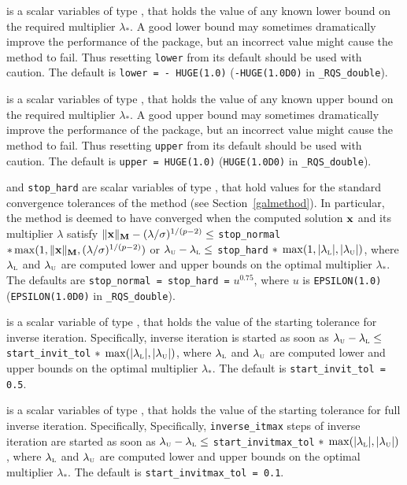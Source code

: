 \documentclass{galahad}
\newcommand{\packagename}{RQS}
\newcommand{\fullpackagename}{\libraryname\_\packagename}
\begin{document}
\begin{description}
 is a scalar variables of type \realdp, that holds the value
of any known lower bound on the required multiplier $\lambda_*$. A good lower
bound may sometimes dramatically improve the performance of the package, but
an incorrect value might cause the method to fail. Thus resetting
{\tt lower} from its default should be used with caution.
The default is {\tt lower = - HUGE(1.0)}
({\tt -HUGE(1.0D0)} in {\tt \fullpackagename\_double}).

 is a scalar variables of type \realdp, that holds the value
of any known upper bound on the required multiplier $\lambda_*$. A good upper
bound may sometimes dramatically improve the performance of the package, but
an incorrect value might cause the method to fail. Thus resetting
{\tt upper} from its default should be used with caution.
The default is {\tt upper = HUGE(1.0)}
({\tt HUGE(1.0D0)} in {\tt \fullpackagename\_double}).

 and {\tt stop\_hard} are scalar variables of type \realdp,
that hold values for the standard convergence tolerances of the method
(see Section~\ref{galmethod}).
In particular, the method is deemed to have converged when the
computed solution ${\mathbf{x}}$ and its multiplier $\lambda$ satisfy
$\|{\mathbf{x}}\|_{{\mathbf{M}}} -  (\lambda/\sigma)^{1/(p-2)} \leq$ {\tt stop\_normal}
$\ast \max(1,\|{\mathbf{x}}\|_{{\mathbf{M}}},(\lambda/\sigma)^{1/(p-2)})$ or
$\lambda_{\mbox{\protect\tiny U}} - \lambda_{\mbox{\protect\tiny L}}
\leq$ {\tt stop\_hard} $\ast \; \max( 1, | \lambda_{\mbox{\protect\tiny L}} |,
| \lambda_{\mbox{\protect\tiny U}} | )$, where
$\lambda_{\mbox{\protect\tiny L}}$ and
$\lambda_{\mbox{\protect\tiny U}}$ are computed lower and upper bounds
on the optimal multiplier $\lambda_*$.
The defaults are {\tt stop\_normal = stop\_hard =} $u^{0.75}$,
where $u$ is {\tt EPSILON(1.0)} ({\tt EPSILON(1.0D0)} in
{\tt \fullpackagename\_double}).

 is a scalar variable of type \realdp, that holds the
value of the starting tolerance for inverse iteration.
Specifically, inverse iteration is started as soon as
$\lambda_{\mbox{\protect\tiny U}} - \lambda_{\mbox{\protect\tiny L}}
\leq$ {\tt start\_invit\_tol} $\ast \;
 \max( | \lambda_{\mbox{\protect\tiny L}} |,
 | \lambda_{\mbox{\protect\tiny U}} | )$, where
$\lambda_{\mbox{\protect\tiny L}}$ and
$\lambda_{\mbox{\protect\tiny U}}$ are computed lower and upper bounds
on the optimal multiplier $\lambda_*$.
The default is {\tt start\_invit\_tol = 0.5}.

 is a scalar variables of type \realdp, that holds the
value of the starting tolerance for full inverse iteration. Specifically,
Specifically, {\tt inverse\_itmax} steps of inverse iteration are
started as soon as
$\lambda_{\mbox{\protect\tiny U}} - \lambda_{\mbox{\protect\tiny L}}
\leq$ {\tt start\_invitmax\_tol} $\ast \;
 \max( | \lambda_{\mbox{\protect\tiny L}} |,
 | \lambda_{\mbox{\protect\tiny U}} | )$, where
$\lambda_{\mbox{\protect\tiny L}}$ and
$\lambda_{\mbox{\protect\tiny U}}$ are computed lower and upper bounds
on the optimal multiplier $\lambda_*$.
The default is {\tt start\_invitmax\_tol = 0.1}.


\end{description}
\end{document}
